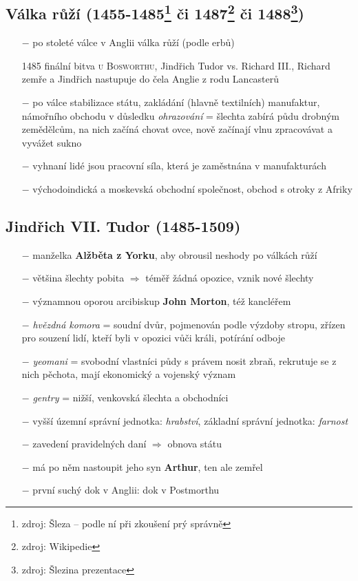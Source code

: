 \documentclass{article}
\begin{document}
\subsection*{Válka růží (1455-1485\footnote{zdroj: Šleza -- podle ní při zkoušení prý správně} či 1487\footnote{zdroj: Wikipedie} či 1488\footnote{zdroj: Šlezina prezentace})}
\begin{itemize}
    \vspace{-0.5em}
    \setlength\itemsep{0.15em}
    \item[$-$] po stoleté válce v Anglii válka růží (podle erbů)
    \item[1485] finální bitva \textsc{u Bosworthu}, Jindřich Tudor vs. Richard III., Richard zemře a Jindřich nastupuje do čela Anglie z rodu Lancasterů
    \item[$-$] po válce stabilizace státu, zakládání (hlavně textilních) manufaktur, námořního obchodu v důsledku \textit{ohrazování} = šlechta zabírá půdu drobným zemědělcům, na nich začíná chovat ovce, nově začínají vlnu zpracovávat a vyvážet sukno
    \item[$-$] vyhnaní lidé jsou pracovní síla, která je zaměstnána v manufakturách
    \item[$-$] východoindická a moskevská obchodní společnost, obchod s otroky z Afriky
\end{itemize}

\subsection*{Jindřich VII. Tudor (1485-1509)}
\begin{itemize}
    \vspace{-0.5em}
    \setlength\itemsep{0.15em}
    \item[$-$] manželka \textbf{Alžběta z Yorku}, aby obrousil neshody po válkách růží
    \item[$-$] většina šlechty pobita $\Rightarrow$ téměř žádná opozice, vznik nové šlechty
    \item[$-$] významnou oporou arcibiskup \textbf{John Morton}, též kancléřem
    \item[$-$] \textit{hvězdná komora} = soudní dvůr, pojmenován podle výzdoby stropu, zřízen pro souzení lidí, kteří byli v opozici vůči králi, potírání odboje
    \item[$-$]  \textit{yeomani} = svobodní vlastníci půdy s právem nosit zbraň, rekrutuje se z nich pěchota, mají ekonomický a vojenský význam
    \item[$-$] \textit{gentry} = nižší, venkovská šlechta a obchodníci
    \item[$-$] vyšší územní správní jednotka: \textit{hrabství}, základní správní jednotka: \textit{farnost}
    \item[$-$] zavedení pravidelných daní $\Rightarrow$ obnova státu
    \item[$-$] má po něm nastoupit jeho syn \textbf{Arthur}, ten ale zemřel
    \item[$-$] první suchý dok v Anglii: dok v Postmorthu
\end{itemize}
\end{document}
